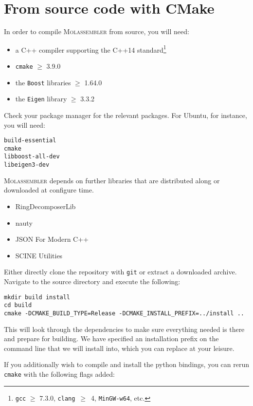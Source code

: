 \documentclass[]{tufte-book}
\begin{document}
\section{From source code with CMake}
In order to compile \textsc{Molassembler} from source, you will need:
\begin{itemize}
  \item a C++ compiler supporting the C++14 standard\footnote{\texttt{gcc} $\ge$
    7.3.0, \texttt{clang}~$\ge$~4, \texttt{MinGW-w64}, etc.}
  \item \texttt{cmake} $\ge$ 3.9.0
  \item the \texttt{Boost} libraries $\ge$ 1.64.0
  \item the \texttt{Eigen} library $\ge$ 3.3.2
\end{itemize}

Check your package manager for the relevant packages. For Ubuntu, for instance,
you will need:

\begin{Verbatim}
build-essential
cmake
libboost-all-dev
libeigen3-dev
\end{Verbatim}

\textsc{Molassembler} depends on further libraries that are distributed along or
downloaded at configure time.

\begin{itemize}
  \item RingDecomposerLib~\cite{Flachsenberg2017, Kolodzik2012} 
  \item nauty~\cite{McKay2014}
  \item JSON For Modern C++~\cite{Lohmann2013} 
  \item SCINE Utilities~\cite{Brunken2019}
\end{itemize}
  
Either directly clone the repository with \texttt{git} or extract a downloaded
archive. Navigate to the source directory and execute the following:

\begin{Verbatim}
mkdir build install
cd build
cmake -DCMAKE_BUILD_TYPE=Release -DCMAKE_INSTALL_PREFIX=../install ..
\end{Verbatim}

This will look through the dependencies to make sure everything needed is there
and prepare for building. We have specified an installation prefix on the
command line that we will install into, which you can replace at your leisure.

If you additionally wish to compile and install the python bindings, you can
rerun \texttt{cmake} with the following flags added:
\end{document}
